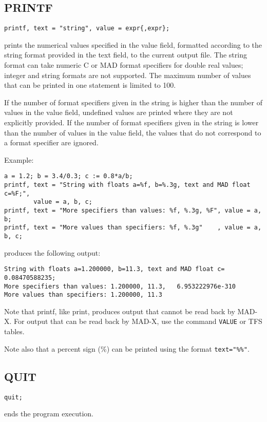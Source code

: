 \subsection{PRINTF}
\begin{verbatim}
printf, text = "string", value = expr{,expr};
\end{verbatim}
prints the numerical values specified in the value field, formatted
according to the string format provided in the text field, to the
current output file.  
The string format can take numeric C or MAD format specifiers for double
real values; integer and string formats are not supported. 
The maximum number of values that can be printed in one
statement is limited to 100. 

If the number of format specifiers given in the string is higher 
than the number of values in the value field, undefined values are printed 
where they are not explicitly provided. 
If the number of format specifiers given in the string is lower 
than the number of values in the value field, the values that 
do not correspond to a format specifier are ignored. 


Example:
\begin{verbatim}
a = 1.2; b = 3.4/0.3; c := 0.8*a/b;
printf, text = "String with floats a=%f, b=%.3g, text and MAD float c=%F;", 
        value = a, b, c;
printf, text = "More specifiers than values: %f, %.3g, %F", value = a, b;
printf, text = "More values than specifiers: %f, %.3g"    , value = a, b, c;
\end{verbatim}
produces the following output:
\begin{verbatim}
String with floats a=1.200000, b=11.3, text and MAD float c=     0.08470588235;
More specifiers than values: 1.200000, 11.3,   6.953222976e-310
More values than specifiers: 1.200000, 11.3
\end{verbatim}

Note that printf, like print, produces output that cannot be read back
by MAD-X. For output that can be read back by MAD-X, use the command
{\tt VALUE} or TFS tables.

Note also that a percent sign (\%) can be printed using the format
\verb|text="%%"|. 

\subsection{QUIT}
\begin{verbatim}
quit;
\end{verbatim} 
ends the program execution. 


